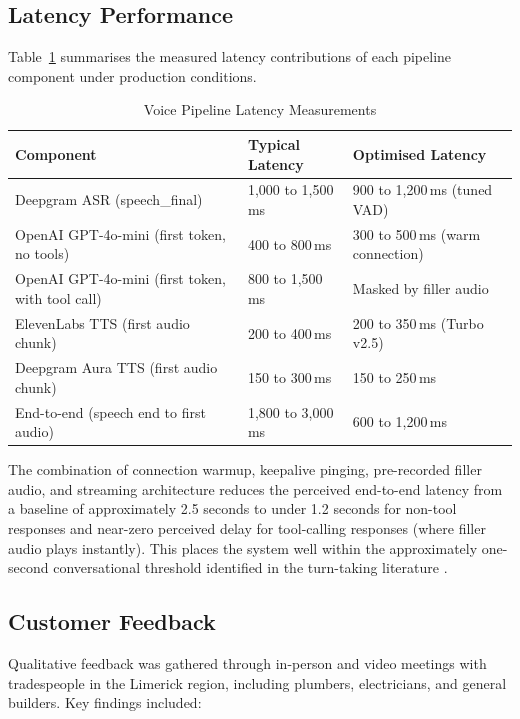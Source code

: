\documentclass[conference]{IEEEtran}
\begin{document}
\subsection{Latency Performance}

Table~\ref{tab:latency} summarises the measured latency contributions of each pipeline component under production conditions.

\begin{table}[htbp]
\caption{Voice Pipeline Latency Measurements}
\begin{center}
\begin{tabular}{lll}
\toprule
\textbf{Component} & \textbf{Typical Latency} & \textbf{Optimised Latency} \\
\midrule
Deepgram ASR (speech\_final) & 1,000 to 1,500\,ms & 900 to 1,200\,ms (tuned VAD) \\
OpenAI GPT-4o-mini (first token, no tools) & 400 to 800\,ms & 300 to 500\,ms (warm connection) \\
OpenAI GPT-4o-mini (first token, with tool call) & 800 to 1,500\,ms & Masked by filler audio \\
ElevenLabs TTS (first audio chunk) & 200 to 400\,ms & 200 to 350\,ms (Turbo v2.5) \\
Deepgram Aura TTS (first audio chunk) & 150 to 300\,ms & 150 to 250\,ms \\
End-to-end (speech end to first audio) & 1,800 to 3,000\,ms & 600 to 1,200\,ms \\
\bottomrule
\end{tabular}
\label{tab:latency}
\end{center}
\end{table}

The combination of connection warmup, keepalive pinging, pre-recorded filler audio, and streaming architecture reduces the perceived end-to-end latency from a baseline of approximately 2.5 seconds to under 1.2 seconds for non-tool responses and near-zero perceived delay for tool-calling responses (where filler audio plays instantly). This places the system well within the approximately one-second conversational threshold identified in the turn-taking literature \cite{b19, b20}.

\subsection{Customer Feedback}

Qualitative feedback was gathered through in-person and video meetings with tradespeople in the Limerick region, including plumbers, electricians, and general builders. Key findings included:
\end{document}
